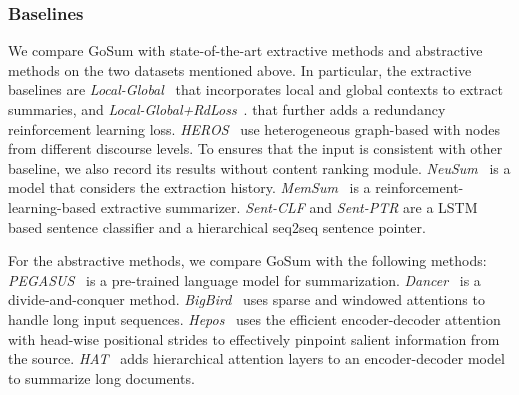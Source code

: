 \documentclass[11pt,a4paper]{article}
\begin{document}
 \subsubsection{Baselines}
We compare GoSum with state-of-the-art extractive methods and abstractive methods on the two datasets mentioned above.
In particular, the extractive baselines are \textit{Local-Global}~  that incorporates local and global contexts to extract summaries, and \textit{Local-Global+RdLoss}~. 
that further adds a redundancy reinforcement learning loss. 
\textit{HEROS}~\cite{discourse_2021} use heterogeneous graph-based with nodes from different discourse levels.
To ensures that the input is consistent with other baseline, we also record its results without content ranking module. 
\textit{NeuSum}~ is a model that considers the extraction history. 
\textit{MemSum}~ is a reinforcement-learning-based extractive summarizer.
\textit{Sent-CLF} and \textit{Sent-PTR} \cite{clfptr_2020} are a LSTM based sentence classifier and a hierarchical seq2seq sentence pointer.

For the abstractive methods, we compare GoSum with the following methods:
\textit{PEGASUS}~\cite{pegasus_2020} is a pre-trained language model for summarization.
\textit{Dancer}~\cite{dancer_2020} is a divide-and-conquer method.
\textit{BigBird}~ uses sparse and windowed attentions to handle long input sequences.
\textit{Hepos}~\cite{hepo_2021} uses the efficient encoder-decoder attention with head-wise positional strides to effectively pinpoint salient information from the source.
\textit{HAT}~\cite{hat_2021} adds hierarchical attention layers to an encoder-decoder model to summarize long documents.







 
\end{document}
